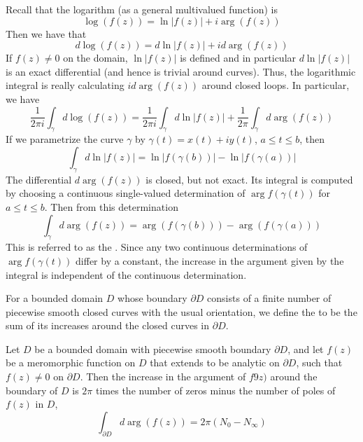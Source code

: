 \documentclass[12pt, a4paper, oneside, openright, titlepage]{book}
\begin{document}
\begin{rmk}
    Recall that the logarithm (as a general multivalued function) is \begin{equation*}
        \log(f(z)) = \ln|f(z)| + i\arg(f(z))
    \end{equation*}
    Then we have that \begin{equation*}
        d\log(f(z)) = d\ln|f(z)| + id\arg(f(z))
    \end{equation*}
    If $f(z) \neq 0$ on the domain, $\ln|f(z)|$ is defined and in particular $d\ln|f(z)|$ is an exact differential (and hence is trivial around curves). Thus, the logarithmic integral is really calculating $id\arg(f(z))$ around closed loops. In particular, we have \begin{equation*}
        \frac{1}{2\pi i}\int_{\gamma}d\log(f(z)) = \frac{1}{2\pi i}\int_{\gamma}d\ln|f(z)| + \frac{1}{2\pi}\int_{\gamma}d\arg(f(z))
    \end{equation*}
    If we parametrize the curve $\gamma$ by $\gamma(t) = x(t)+iy(t)$, $a \leq t \leq b$, then \begin{equation*}
        \int_{\gamma}d\ln|f(z)| = \ln|f(\gamma(b))| - \ln|f(\gamma(a))|
    \end{equation*}
    The differential $d\arg(f(z))$ is closed, but not exact. Its integral is computed by choosing a continuous single-valued determination of $\arg f(\gamma(t))$ for $a \leq t \leq b$. Then from this determination \begin{equation*}
        \int_{\gamma}d\arg(f(z)) = \arg(f(\gamma(b))) - \arg(f(\gamma(a)))
    \end{equation*}
    This is referred to as the . Since any two continuous determinations of $\arg f(\gamma(t))$ differ by a constant, the increase in the argument given by the integral is independent of the continuous determination.
\end{rmk}

For a bounded domain $D$ whose boundary $\partial D$ consists of a finite number of piecewise smooth closed curves with the usual orientation, we define the  to be the sum of its increases around the closed curves in $\partial D$.

\begin{thm}
    Let $D$ be a bounded domain with piecewise smooth boundary $\partial D$, and let $f(z)$ be a meromorphic function on $D$ that extends to be analytic on $\partial D$, such that $f(z) \neq 0$ on $\partial D$. Then the increase in the argument of $f9z)$ around the boundary of $D$ is $2\pi$ times the number of zeros minus the number of poles of $f(z)$ in $D$,\begin{equation*}
        \int_{\partial D}d\arg(f(z)) = 2\pi(N_0-N_{\infty})
    \end{equation*}
\end{thm}
\end{document}
